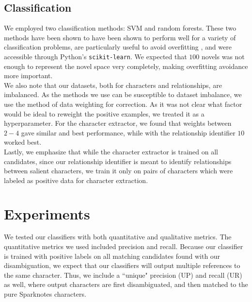 \documentclass[12pt]{article}
\begin{document}
    \subsection{Classification}

        We employed two classification methods: SVM and random forests. These
        two methods have been shown to have been shown to perform well for a variety of
        classification problems, are particularly useful to avoid overfitting \cite{hearst1998support,breiman2001random},
        and were accessible through Python's \texttt{scikit-learn}.
        We expected that $100$ novels was not enough to represent the novel space very completely,
        making overfitting avoidance more important. \\

        We also note that our datasets, both for characters and relationships, are imbalanced.
        As the methods we use can be susceptible to dataset imbalance, we use the method of
        data weighting for correction. As it was not clear what factor would be ideal to 
        reweight the positive examples, we treated it as a hyperparameter. For the character
        extractor, we found that weights between $2-4$ gave similar and best performance,
        while with the relationship identifier $10$ worked best. \\

        Lastly, we emphasize that while the character extractor is trained on all candidates,
        since our relationship identifier is meant to identify relationships between salient
        characters, we train it only on pairs of characters which were labeled as positive
        data for character extraction.

\section{Experiments}

    We tested our classifiers with both quantitative and qualitative metrics. The quantitative
    metrics we used included precision and recall. Because our classifier is trained with positive 
    labels on all matching candidates found with our disambiguation, we expect that our classifiers 
    will output multiple references to the same character. Thus, we include a ``unique" precision (UP) 
    and recall (UR) as well, where output characters are first disambiguated, and then matched to
    the pure Sparknotes characters. \\
    
\end{document}
